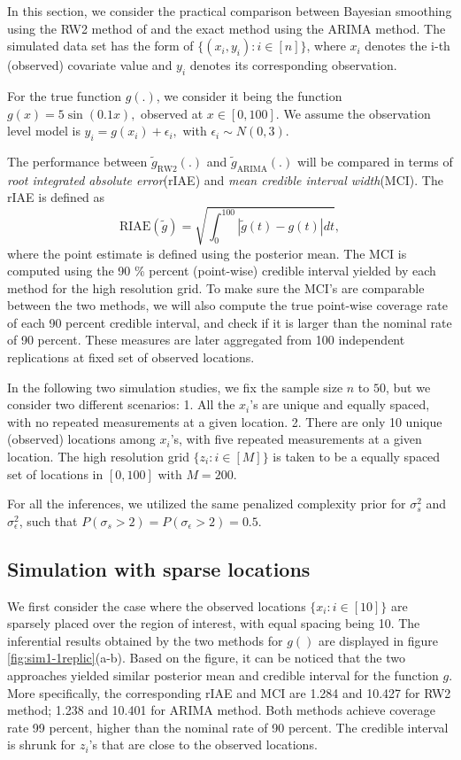 \documentclass{article}
\begin{document}
In this section, we consider the practical comparison between Bayesian smoothing using the RW2 method of \cite{rw2} and the exact method using the ARIMA method. 
The simulated data set has the form of $\{(x_i,y_i):i\in[n]\}$, where $x_i$ denotes the i-th (observed) covariate value and $y_i$ denotes its corresponding observation. 

For the true function $g(.)$, we consider it being the function $g(x) = 5\sin(0.1x),$ observed at $x \in [0,100]$. We assume the observation level model is $y_i = g(x_i) + \epsilon_i, $ with $\epsilon_i \sim N(0,3)$.

The performance between $\tilde{g}_{\text{RW2}}(.)$ and $\tilde{g}_{\text{ARIMA}}(.)$ will be compared in terms of \textit{root integrated absolute error}(rIAE) and \textit{mean credible interval width}(MCI). The rIAE is defined as $$\text{RIAE}(\tilde{g}) = \sqrt{ \int_0^{100}|\tilde{g}(t)-g(t)|dt},$$ where the point estimate is defined using the posterior mean. The MCI is computed using the 90 \% percent (point-wise) credible interval yielded by each method for the high resolution grid. To make sure the MCI's are comparable between the two methods, we will also compute the true point-wise coverage rate of each 90 percent credible interval, and check if it is larger than the nominal rate of 90 percent. These measures are later aggregated from 100 independent replications at fixed set of observed locations.

In the following two simulation studies, we fix the sample size $n$ to $50$, but we consider two different scenarios: 1. All the $x_i$'s are unique and equally spaced, with no repeated measurements at a given location. 2. There are only 10 unique (observed) locations among $x_i$'s, with five repeated measurements at a given location. The high resolution grid $\{z_i: i\in [M] \}$ is taken to be a equally spaced set of locations in $[0,100]$ with $M = 200$.

For all the inferences, we utilized the same penalized complexity prior \citep{simpson2017penalising} for $\sigma_s^2$ and $\sigma_\epsilon^2$, such that $P(\sigma_s > 2) = P(\sigma_\epsilon > 2) = 0.5$.


\subsection{Simulation with sparse locations}

We first consider the case where the observed locations $\{x_i: i \in [10] \}$ are sparsely placed over the region of interest, with equal spacing being 10. The inferential results obtained by the two methods for $g()$ are displayed in figure \ref{fig:sim1-1replic}(a-b). Based on the figure, it can be noticed that the two approaches yielded similar posterior mean and credible interval for the function $g$. More specifically, the corresponding rIAE and MCI are 1.284 and 10.427 for RW2 method; 1.238 and 10.401 for ARIMA method. Both methods achieve coverage rate 99 percent, higher than the nominal rate of 90 percent. The credible interval is shrunk for $z_i$'s that are close to the observed locations.
\end{document}
